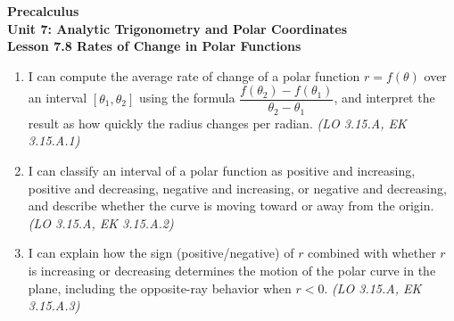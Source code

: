 \documentclass[10pt]{article}
\begin{document}
\vspace{-0.8in}

\begin{center}
  {\color{white}\textbf{\LARGE Precalculus}}\\[4pt]
  {\color{skymid}\large\textbf{Unit 7: Analytic Trigonometry and Polar Coordinates}}\\[6pt]
  {\color{white}\textbf{\large Lesson 7.8 \quad Rates of Change in Polar Functions}}
\end{center}

\vspace{0.22in}
\namedateperiod
\vspace{0.18in}

\begin{learningtargetbox}
\small
\begin{enumerate}[leftmargin=1.5em, itemsep=5pt]
  \item I can compute the average rate of change of a polar function $r = f(\theta)$
    over an interval $[\theta_1, \theta_2]$ using the formula
    $\dfrac{f(\theta_2)-f(\theta_1)}{\theta_2-\theta_1}$, and interpret the result
    as how quickly the radius changes per radian.
    \hfill\textit{(LO 3.15.A, EK 3.15.A.1)}
  \item I can classify an interval of a polar function as positive and increasing,
    positive and decreasing, negative and increasing, or negative and decreasing,
    and describe whether the curve is moving toward or away from the origin.
    \hfill\textit{(LO 3.15.A, EK 3.15.A.2)}
  \item I can explain how the sign (positive/negative) of $r$ combined with whether
    $r$ is increasing or decreasing determines the motion of the polar curve in the
    plane, including the opposite-ray behavior when $r < 0$.
    \hfill\textit{(LO 3.15.A, EK 3.15.A.3)}
\end{enumerate}
\end{learningtargetbox}

\vspace{0.14in}
\end{document}

